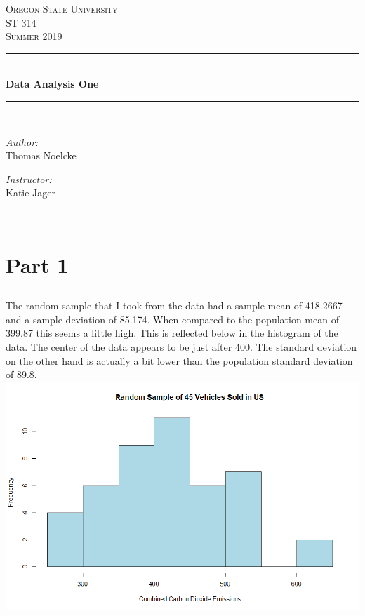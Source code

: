 \documentclass[letterpaper, onecolumn,10pt]{IEEEtran}
\begin{document}
    \begin{titlepage}
    \newcommand{\HRule}{\rule{\linewidth}{0.5mm}}
    \center
    \textsc{\Large Oregon State University}\\[1.5cm]
    \textsc{\Large ST 314}\\[0.5cm]
    \textsc{\Large Summer 2019}\\[0.5cm]
    \HRule \\[0.4cm]
    { \huge \bfseries Data Analysis One}\\[0.4cm] %
    \HRule \\[1.5cm]
    \begin{minipage}{0.4\textwidth}
        \begin{flushleft} \large
        \emph{Author:}\\
        Thomas Noelcke
        \end{flushleft}
    \end{minipage}
    \begin{minipage}{0.4\textwidth}
        \begin{flushright} \large
        \emph{Instructor:} \\
        Katie Jager\\
        \end{flushright}
    \end{minipage}\\[2cm]
		\end{titlepage}
        
        \section{Part 1}
            \subsection{}
            The random sample that I took from the data had a sample mean of 418.2667 and a sample deviation of 85.174. When compared to the population mean of 399.87 this seems a little high. This is reflected below in the histogram of the data. The center of the data appears to be just after 400. The standard deviation on the other hand is actually a bit lower than the population standard deviation of 89.8.\\
            
            \includegraphics[width=\textwidth]{week4/Images/Rplot.png}
            
\end{document}

